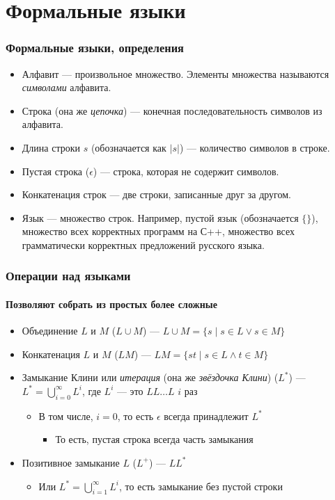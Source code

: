 \documentclass[xetex,mathserif,serif]{beamer}
\begin{document}
	\section{Формальные языки}

	\begin{frame}
		\frametitle{Формальные языки, определения}
		\begin{itemize}
			\item Алфавит --- произвольное множество. Элементы множества называются \textit{символами} алфавита.
			\item Строка (она же \textit{цепочка}) --- конечная последовательность символов из алфавита.
			\item Длина строки $s$ (обозначается как $\lvert{s}\rvert$) --- количество символов в строке.
			\item Пустая строка ($\epsilon$) --- строка, которая не содержит символов.
			\item Конкатенация строк --- две строки, записанные друг за другом.
			\item Язык --- множество строк. Например, пустой язык (обозначается $\{\}$), множество всех корректных 
				программ на С++, множество всех грамматически корректных предложений русского языка.
		\end{itemize}
	\end{frame}

	\begin{frame}
		\frametitle{Операции над языками}
		\framesubtitle{Позволяют собрать из простых более сложные}
		\begin{itemize}
			\item Объединение $L$ и $M$ ($L \cup M$) --- $L \cup M = \{s \mid s \in L \vee s \in M\}$
			\item Конкатенация $L$ и $M$ ($LM$) --- $LM = \{st \mid s \in L \wedge t \in M\}$
			\item Замыкание Клини или \textit{итерация} (она же \textit{звёздочка Клини}) ($L^*$) --- 
				$L^* = \bigcup\limits_{i=0}^{\infty}L^i$, где $L^i$ --- это $LL \ldots L$ $i$ раз
			\begin{itemize}
				\item В том числе, $i = 0$, то есть $\epsilon$ всегда принадлежит $L^*$
				\begin{itemize}
					\item То есть, пустая строка всегда часть замыкания
				\end{itemize}
			\end{itemize}
			\item Позитивное замыкание $L$ ($L^+$) --- $LL^*$
			\begin{itemize}
				\item Или $L^* = \bigcup\limits_{i=1}^{\infty}L^i$, то есть замыкание без пустой строки
			\end{itemize}
		\end{itemize}
	\end{frame}
\end{document}
